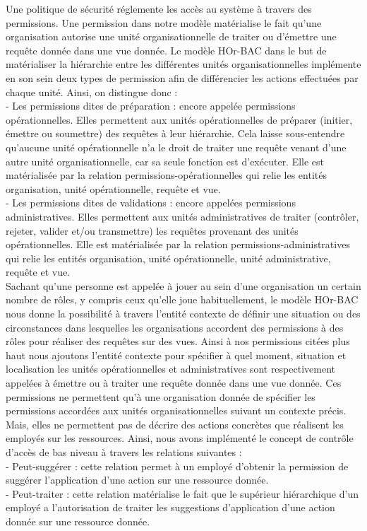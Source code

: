 Une politique de sécurité réglemente les accès au système à travers des permissions. Une permission dans notre modèle matérialise le fait qu'une organisation autorise une unité organisationnelle de traiter ou d'émettre une requête donnée dans une vue donnée. Le modèle HOr-BAC  dans le but de matérialiser la hiérarchie entre les différentes unités organisationnelles implémente en son sein deux types de permission afin de différencier les actions effectuées par chaque unité. Ainsi, on distingue donc :\\
- Les permissions dites de préparation : encore appelée permissions opérationnelles. Elles permettent aux unités opérationnelles de préparer (initier, émettre ou soumettre) des requêtes à leur hiérarchie. Cela laisse sous-entendre qu'aucune unité opérationnelle n'a le droit de traiter une requête venant d'une autre unité organisationnelle, car sa seule fonction est d'exécuter. Elle est matérialisée par la relation permissions-opérationnelles qui relie les entités organisation, unité opérationnelle, requête et vue.\\
- Les permissions dites de validations : encore appelées permissions administratives. Elles permettent aux unités administratives de traiter (contrôler, rejeter, valider et/ou transmettre) les requêtes provenant des unités opérationnelles. Elle est matérialisée par la relation permissions-administratives qui relie les entités organisation, unité opérationnelle, unité administrative, requête et vue. \\
Sachant qu'une personne est appelée à jouer au sein d'une organisation un certain nombre de rôles, y compris ceux qu'elle joue habituellement, le modèle HOr-BAC nous donne la possibilité à travers l'entité contexte de définir une situation ou des circonstances dans lesquelles les organisations accordent des permissions à des rôles pour réaliser des requêtes sur des vues. Ainsi à nos permissions citées plus haut nous ajoutons l'entité contexte pour spécifier à quel moment, situation et localisation les unités opérationnelles et administratives sont respectivement appelées à émettre ou à traiter une requête donnée dans une vue donnée. Ces permissions ne permettent qu'à une organisation donnée de spécifier les permissions accordées aux unités organisationnelles suivant un contexte précis. Mais, elles ne permettent pas de  décrire des actions concrètes que réalisent les employés sur les ressources. Ainsi, nous avons implémenté le concept de contrôle d'accès de bas niveau à travers les relations suivantes :\\
- Peut-suggérer : cette relation permet à un employé d'obtenir la permission de suggérer l'application d'une action sur une ressource donnée.\\
- Peut-traiter : cette relation matérialise le fait que le supérieur hiérarchique d'un employé a l'autorisation de traiter les suggestions d'application d'une action donnée sur une ressource donnée.

